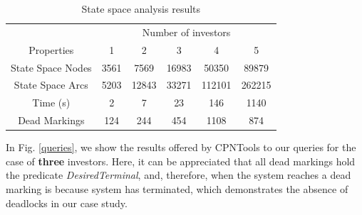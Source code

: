 \begin{table} [htp]
\centering
\footnotesize{
\begin{tabular}{|c|c|c|c|c|c|}
  \hline
     & \multicolumn{5}{c|}{Number of investors}\\\cline{2-6}%
  Properties     & 1 & 2 & 3 & 4 & 5 \\ \hline
  State Space Nodes & 3561  & 7569 & 16983 & 50350 & 89879 \\
  State Space Arcs & 5203 & 12843 & 33271  & 112101 &262215 \\
  Time (s) & 2 & 7 & 23 & 146 &  1140\\
  Dead Markings & 124 & 244  & 454  & 1108 &  874 \\
  \hline
\end{tabular}
}
\vspace{-0.2cm}
\caption{State space analysis results}
\label{state_space}
\end{table}

In Fig. \ref{queries}, we show the results offered by CPNTools to
our queries for the case of {\bf three} investors. Here, it can be
appreciated that all dead markings hold the predicate {\em DesiredTerminal}, and, therefore, when the system reaches a dead marking is because system has terminated, which demonstrates the absence of deadlocks in our case study. 

